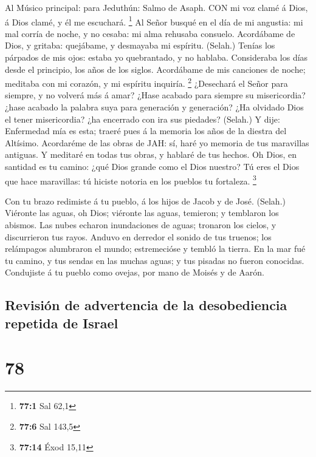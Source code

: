  Al Músico principal: para Jeduthún: Salmo de Asaph. CON mi
voz clamé á Dios, á Dios clamé, y él me escuchará. \footnote{\textbf{77:1}
  Sal 62,1}  Al Señor busqué en el día de mi angustia: mi
mal corría de noche, y no cesaba: mi alma rehusaba consuelo.
 Acordábame de Dios, y gritaba: quejábame, y desmayaba mi
espíritu. (Selah.)  Tenías los párpados de mis ojos: estaba
yo quebrantado, y no hablaba.  Consideraba los días desde el
principio, los años de los siglos.  Acordábame de mis
canciones de noche; meditaba con mi corazón, y mi espíritu inquiría.
\footnote{\textbf{77:6} Sal 143,5}  ¿Desechará el Señor para
siempre, y no volverá más á amar?  ¿Hase acabado para
siempre su misericordia? ¿hase acabado la palabra suya para generación y
generación?  ¿Ha olvidado Dios el tener misericordia? ¿ha
encerrado con ira sus piedades? (Selah.)  Y dije:
Enfermedad mía es esta; traeré pues á la memoria los años de la diestra
del Altísimo.  Acordaréme de las obras de JAH: sí, haré yo
memoria de tus maravillas antiguas.  Y meditaré en todas
tus obras, y hablaré de tus hechos.  Oh Dios, en santidad
es tu camino: ¿qué Dios grande como el Dios nuestro?  Tú
eres el Dios que hace maravillas: tú hiciste notoria en los pueblos tu
fortaleza. \footnote{\textbf{77:14} Éxod 15,11}

 Con tu brazo redimiste á tu pueblo, á los hijos de Jacob y
de José. (Selah.)  Viéronte las aguas, oh Dios; viéronte
las aguas, temieron; y temblaron los abismos.  Las nubes
echaron inundaciones de aguas; tronaron los cielos, y discurrieron tus
rayos.  Anduvo en derredor el sonido de tus truenos; los
relámpagos alumbraron el mundo; estremecióse y tembló la tierra.
 En la mar fué tu camino, y tus sendas en las muchas aguas;
y tus pisadas no fueron conocidas.  Condujiste á tu pueblo
como ovejas, por mano de Moisés y de Aarón.

\hypertarget{revisiuxf3n-de-advertencia-de-la-desobediencia-repetida-de-israel}{%
\subsection{Revisión de advertencia de la desobediencia repetida de
Israel}\label{revisiuxf3n-de-advertencia-de-la-desobediencia-repetida-de-israel}}

\hypertarget{section-77}{%
\section{78}\label{section-77}}

